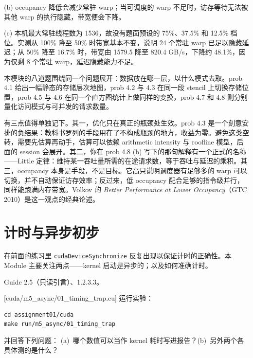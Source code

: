 \documentclass[11pt,a4paper,fontset=windows]{ctexart}
\begin{document}
(b) occupancy 降低会减少常驻 warp；当可调度的 warp 不足时，访存等待无法被其他 warp 的执行隐藏，带宽便会下降。

(c) 本机最大常驻线程数为 1536，故没有题面预设的 75\%、37.5\% 和 12.5\% 档位。实测从 100\% 降至 50\% 时带宽基本不变，说明 24 个常驻 warp 已足以隐藏延迟；从 50\% 降至 16.7\% 时，带宽由 1579.5 降至 820.4 GB/s，下降约 48.1\%，因为仅剩 8 个常驻 warp，延迟隐藏能力不足。

\begin{lookback}
本模块的八道题围绕同一个问题展开：数据放在哪一层，以什么模式去取。prob 4.1 给出一幅静态的存储层次地图，prob 4.2 与 4.3 在同一段 stencil 上切换存储位置，prob 4.5 与 4.6 在同一个直方图统计上做同样的变换，prob 4.7 和 4.8 则分别量化访问模式与可并发的请求数量。

有三点值得单独记下。其一，优化只在真正的瓶颈处生效。prob 4.3 是一个刻意安排的负结果：教科书罗列的手段用在了不构成瓶颈的地方，收益为零。避免这类空转，需要先估算再动手，估算可以依赖 arithmetic intensity 与 roofline 模型，后面的 session 会展开。其二，你在 prob 4.8 (b) 写下的那句解释有一个正式的名称——Little 定律：维持某一吞吐量所需的在途请求数，等于吞吐与延迟的乘积。其三，occupancy 本身是手段，不是目标。它高只说明调度器有足够多的 warp 可以切换，并不自动保证访存效率；反过来，低 occupancy 配合足够的指令级并行，同样能跑满内存带宽。Volkov 的 \textit{Better Performance at Lower Occupancy}（GTC 2010）是这一观点的经典论述。
\end{lookback}

\section{计时与异步初步}

在前面的练习里 \texttt{cudaDeviceSynchronize} 反复出现以保证计时的正确性。本 Module 主要关注两点——kernel 启动是异步的；以及如何准确计时。

\begin{reading}
Guide 2.5（只读引言）、1.2.3.3。
\end{reading}

[cuda/m5\_async/01\_timing\_trap.cu]
运行实验：

\begin{lstlisting}
cd assignment01/cuda
make run/m5_async/01_timing_trap
\end{lstlisting}

并回答下列问题：
(a)~哪个数值可以当作 kernel 耗时写进报告？(b)~另外两个各具体测的是什么？
\end{document}
